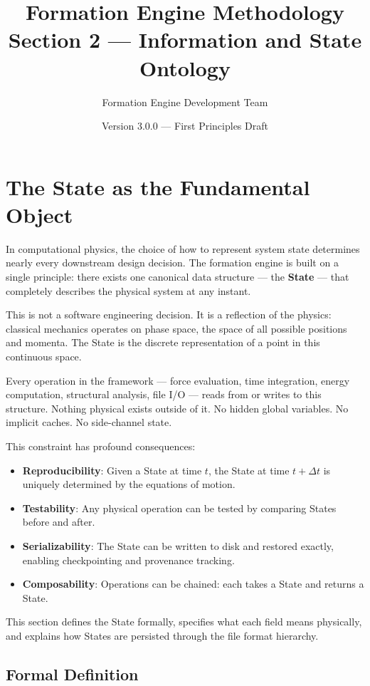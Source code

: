 \documentclass[11pt]{article}
\title{\textbf{Formation Engine Methodology} \\
\Large Section 2 — Information and State Ontology}
\author{Formation Engine Development Team}
\date{Version 3.0.0 — First Principles Draft}
\begin{document}
\maketitle

\section{The State as the Fundamental Object}

In computational physics, the choice of how to represent system state determines nearly every downstream design decision. The formation engine is built on a single principle: there exists one canonical data structure — the \textbf{State} — that completely describes the physical system at any instant.

This is not a software engineering decision. It is a reflection of the physics: classical mechanics operates on phase space, the space of all possible positions and momenta. The State is the discrete representation of a point in this continuous space.

Every operation in the framework — force evaluation, time integration, energy computation, structural analysis, file I/O — reads from or writes to this structure. Nothing physical exists outside of it. No hidden global variables. No implicit caches. No side-channel state.

This constraint has profound consequences:

\begin{itemize}
\item \textbf{Reproducibility}: Given a State at time $t$, the State at time $t + \Delta t$ is uniquely determined by the equations of motion.
\item \textbf{Testability}: Any physical operation can be tested by comparing States before and after.
\item \textbf{Serializability}: The State can be written to disk and restored exactly, enabling checkpointing and provenance tracking.
\item \textbf{Composability}: Operations can be chained: each takes a State and returns a State.
\end{itemize}

This section defines the State formally, specifies what each field means physically, and explains how States are persisted through the file format hierarchy.

\subsection{Formal Definition}
\end{document}
